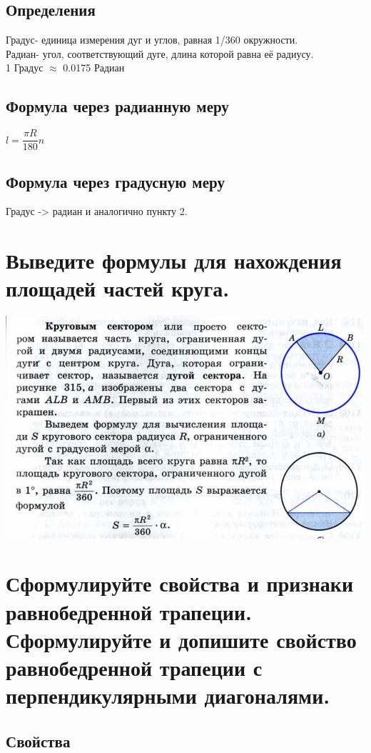 \documentclass[12pt, letterpaper]{article}
\begin{document}
\subsection{Определения}
Градус- единица измерения дуг и углов, равная 1/360 окружности. \\
Радиан- угол, соответствующий дуге, длина которой равна её радиусу. \\
1 Градус $\approx$ 0.0175 Радиан \\
\subsection{Формула через радианную меру}
$ l=\dfrac{\pi R}{180} n $ \\
\subsection{Формула через градусную меру}
Градус -> радиан и аналогично пункту 2. \\ 


\section {Выведите формулы для нахождения площадей частей круга. }
\includegraphics[scale=0.3]{legal-4.jpg} \\

\section {Сформулируйте свойства и признаки равнобедренной трапеции. Сформулируйте и допишите свойство равнобедренной трапеции с перпендикулярными диагоналями.}
\subsection{Свойства}
\end{document}
